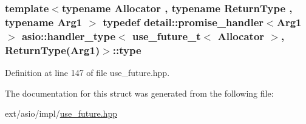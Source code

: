 \subsubsection[{type}]{\setlength{\rightskip}{0pt plus 5cm}template$<$typename Allocator , typename Return\+Type , typename Arg1 $>$ typedef {\bf detail\+::promise\+\_\+handler}$<$Arg1$>$ {\bf asio\+::handler\+\_\+type}$<$ {\bf use\+\_\+future\+\_\+t}$<$ Allocator $>$, Return\+Type(Arg1)$>$\+::{\bf type}}\label{structasio_1_1handler__type_3_01use__future__t_3_01_allocator_01_4_00_01_return_type_07_arg1_08_4_aa4bca092e3f7ab436ab9a136bbae80f5}


Definition at line 147 of file use\+\_\+future.\+hpp.



The documentation for this struct was generated from the following file\+:\begin{DoxyCompactItemize}
\item 
ext/asio/impl/\hyperlink{impl_2use__future_8hpp}{use\+\_\+future.\+hpp}\end{DoxyCompactItemize}
